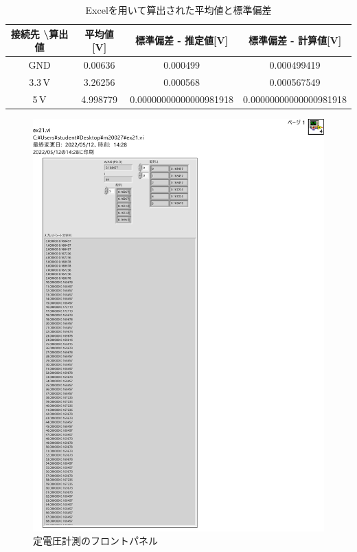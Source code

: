 \begin{table}[h]
\centering
\caption{Excelを用いて算出された平均値と標準偏差}
\label{tab:means}
\begin{tabular}{cccc}
\hline
    接続先 	\textbackslash 算出値 &平均値[\rm{V}] &標準偏差 - 推定値[\rm{V}]   & 標準偏差 - 計算値[\rm{V}]    \\
     \hline
  GND& 0.00636  & 0.000499  & 0.000499419 \\
3.3\,\rm{V} & 3.26256 & 0.000568 & 0.000567549 \\
 5\,\rm{V}& 4.998779 & 0.00000000000000981918 &  0.00000000000000981918 \\
\hline
\end{tabular}
\end{table}

\begin{figure}[h]
\centering
\includegraphics[scale=0.35]{./fig/ex21-flont.pdf}
\caption{定電圧計測のフロントパネル}
\label{fig:ex21-flont}
\end{figure}

